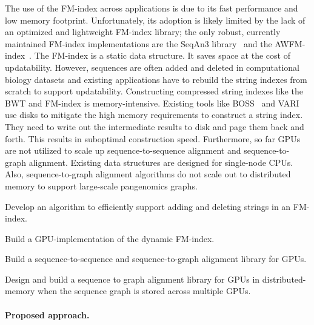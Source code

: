 The use of the FM-index across applications is due to its fast performance and low memory footprint. Unfortunately, its adoption is likely limited by the lack of an optimized and lightweight FM-index library; the only robust, currently maintained FM-index implementations are the SeqAn3 library~\cite{Reinert2017} and the AWFM-index~\cite{Anderson2021}.
%
The FM-index is a static data structure. It saves space at the cost of updatability. However, sequences are often added and deleted in computational biology datasets and existing applications have to rebuild the string indexes from scratch to support updatability.
%
Constructing compressed string indexes like the BWT and FM-index is memory-intensive. Existing tools like BOSS~\cite{Bowe2012} and VARI~\cite{Muggli2019} use disks to mitigate the high memory requirements to construct a string index. They need to write out the intermediate results to disk and page them back and forth. This results in suboptimal construction speed.
%
Furthermore, so far GPUs are not utilized to scale up sequence-to-sequence alignment and sequence-to-graph alignment. Existing data structures are designed for single-node CPUs. Also, sequence-to-graph alignment algorithms do not scale out to distributed memory to support large-scale pangenomics graphs.

\begin{rproblem}
Develop an algorithm to efficiently support adding and deleting strings in an FM-index.
\label{rpob:dynamic-fmindex}
\end{rproblem}

\begin{rproblem}
Build a GPU-implementation of the dynamic FM-index.
\label{rpob:gpu-fmindex}
\end{rproblem}


\begin{rproblem}
Build a sequence-to-sequence and sequence-to-graph alignment library for GPUs.
\end{rproblem}

\begin{rproblem}
Design and build a sequence to graph alignment library for GPUs in distributed-memory when the sequence graph is stored across multiple GPUs.
\end{rproblem}

\paragraph{Proposed approach.}

